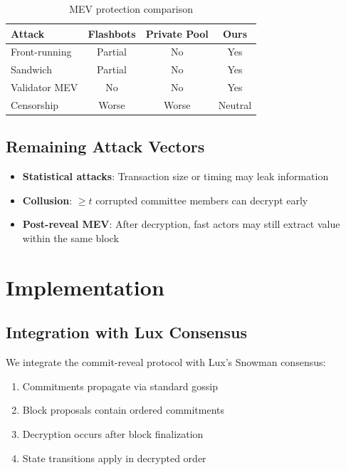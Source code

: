 \documentclass[11pt,a4paper]{article}
\theoremstyle{definition}
\begin{document}
\begin{table}[h]
\centering
\begin{tabular}{lccc}
\toprule
\textbf{Attack} & \textbf{Flashbots} & \textbf{Private Pool} & \textbf{Ours} \\
\midrule
Front-running & Partial & No & Yes \\
Sandwich & Partial & No & Yes \\
Validator MEV & No & No & Yes \\
Censorship & Worse & Worse & Neutral \\
\bottomrule
\end{tabular}
\caption{MEV protection comparison}
\end{table}

\subsection{Remaining Attack Vectors}

\begin{itemize}
    \item \textbf{Statistical attacks}: Transaction size or timing may leak information
    \item \textbf{Collusion}: $\geq t$ corrupted committee members can decrypt early
    \item \textbf{Post-reveal MEV}: After decryption, fast actors may still extract value within the same block
\end{itemize}

\section{Implementation}

\subsection{Integration with Lux Consensus}

We integrate the commit-reveal protocol with Lux's Snowman consensus:

\begin{enumerate}
    \item Commitments propagate via standard gossip
    \item Block proposals contain ordered commitments
    \item Decryption occurs after block finalization
    \item State transitions apply in decrypted order
\end{enumerate}
\end{document}
